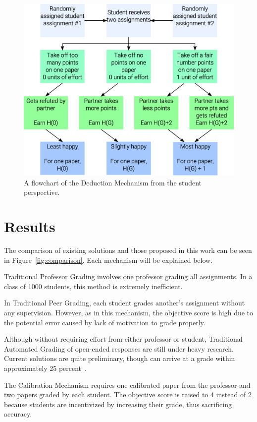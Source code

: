 \documentclass{sigchi}
\begin{document}
\begin{figure}[!h]
\centering
\includegraphics[width=0.9\columnwidth]{Deduction-Flowchart.eps}
\caption{A flowchart of the Deduction Mechanism from the student perspective.}
\label{fig:deduction}
\end{figure}

\section{Results}
The comparison of existing solutions and those proposed in this work can be seen in Figure~\ref{fig:comparison}. Each mechanism will be explained below.

Traditional Professor Grading involves one professor grading all assignments. In a class of 1000 students, this method is extremely inefficient.

In Traditional Peer Grading, each student grades another's assignment without any supervision. However, as in this mechanism, the objective score is high due to the potential error caused by lack of motivation to grade properly.

Although without requiring effort from either professor or student, Traditional Automated Grading of open-ended responses are still under heavy research. Current solutions are quite preliminary, though can arrive at a grade within approximately 25 percent~\cite{automatedsystemssuck}.

The Calibration Mechanism requires one calibrated paper from the professor and two papers graded by each student. The objective score is raised to 4 instead of 2 because students are incentivized by increasing their grade, thus sacrificing accuracy.
\end{document}
